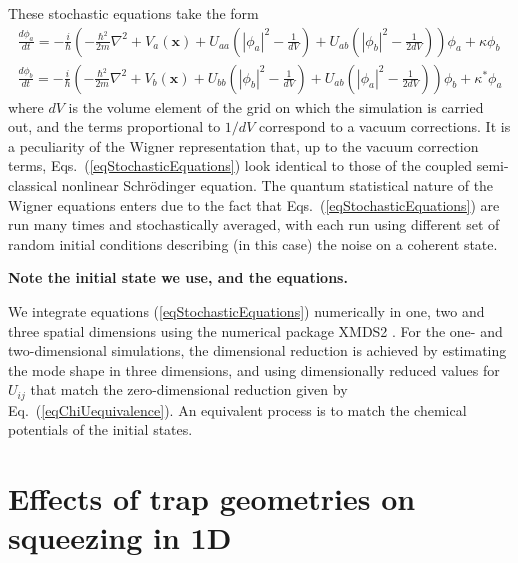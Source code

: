 \documentclass{iopart}
\begin{document}
These stochastic equations take the form
\begin{eqnarray}
\frac{d \phi_a}{dt} = -\frac{i}{\hbar}\left(-\frac{\hbar^2}{2 m}\nabla^2+V_a(\mathbf{x}) + U_{a a} \left( \left|\phi_{a}\right|^2 -\frac{1}{dV}\right) + U_{a b} \left( \left|\phi_b\right|^2 -\frac{1}{2dV}\right)  \right)\phi_a   + \kappa \phi_b  \nonumber \\
\frac{d \phi_b}{dt} = -\frac{i}{\hbar}\left(-\frac{\hbar^2}{2 m}\nabla^2+V_b(\mathbf{x}) + U_{b b} \left( \left|\phi_{b}\right|^2 - \frac{1}{dV} \right) + U_{a b} \left( \left|\phi_a\right|^2 -\frac{1}{2dV} \right)   \right)\phi_b   + \kappa^* \phi_a
  \label{eqStochasticEquations}
\end{eqnarray}
where $dV$ is the volume element of the grid on which the simulation is carried out, and the terms proportional to $1/dV$ correspond to a vacuum corrections. It is a peculiarity of the Wigner representation that, up to the vacuum correction terms, Eqs.~(\ref{eqStochasticEquations}) look identical to those of the coupled semi-classical nonlinear Schr{\"{o}}dinger equation. The quantum statistical nature of the Wigner equations enters due to the fact that Eqs.~(\ref{eqStochasticEquations}) are run many times and stochastically averaged, with each run using different set of random initial conditions describing (in this case) the noise on a coherent state.


\textbf{Note the initial state we use, and the equations.}

We integrate equations (\ref{eqStochasticEquations}) numerically in one, two and three spatial dimensions using the numerical package XMDS2 \cite{dennis2013}.  For the one- and two-dimensional simulations, the dimensional reduction is achieved by estimating the mode shape in three dimensions, and using dimensionally reduced values for $U_{ij}$ that match the zero-dimensional reduction given by Eq.~(\ref{eqChiUequivalence}).  An equivalent process is to match the chemical potentials of the initial states.  

\section{Effects of trap geometries on squeezing in 1D}
\end{document}
